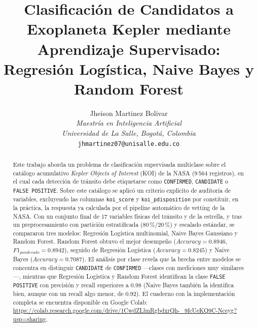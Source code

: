 \documentclass[10pt,journal]{IEEEtran}
\begin{document}
  \title{Clasificaci\'on de Candidatos a Exoplaneta Kepler mediante Aprendizaje Supervisado:\\
    Regresi\'on Log\'istica, Naive Bayes y Random Forest}

  \author{
    Jheison Martinez Bolivar\\
    \textit{Maestr\'ia en Inteligencia Artificial}\\
    \textit{Universidad de La Salle, Bogot\'a, Colombia}\\
    \texttt{jhmartinez07@unisalle.edu.co}
  }
  \maketitle

  \begin{abstract}
    Este trabajo aborda un problema de clasificaci\'on supervisada multiclase sobre el cat\'alogo acumulativo \emph{Kepler Objects of Interest} (KOI) de la NASA (9\,564 registros), en el cual cada detecci\'on de tr\'ansito debe etiquetarse como \texttt{CONFIRMED}, \texttt{CANDIDATE} o \texttt{FALSE POSITIVE}. Sobre este cat\'alogo se aplic\'o un criterio expl\'icito de auditor\'ia de variables, excluyendo las columnas \texttt{koi\_score} y \texttt{koi\_pdisposition} por constituir, en la pr\'actica, la respuesta ya calculada por el pipeline autom\'atico de vetting de la NASA. Con un conjunto final de 17 variables f\'isicas del tr\'ansito y de la estrella, y tras un preprocesamiento con partici\'on estratificada (80\,\%/20\,\%) y escalado est\'andar, se compararon tres modelos: Regresi\'on Log\'istica multinomial, Naive Bayes Gaussiano y Random Forest. Random Forest obtuvo el mejor desempe\~no ($Accuracy=0.8946$, $F1_{ponderado}=0.8942$), seguido de Regresi\'on Log\'istica ($Accuracy=0.8245$) y Naive Bayes ($Accuracy=0.7087$). El an\'alisis por clase revela que la brecha entre modelos se concentra en distinguir \texttt{CANDIDATE} de \texttt{CONFIRMED} —clases con mediciones muy similares—, mientras que Regresi\'on Log\'istica y Random Forest identifican la clase \texttt{FALSE POSITIVE} con precisi\'on y recall superiores a 0.98 (Naive Bayes tambi\'en la identifica bien, aunque con un recall algo menor, de 0.92). El cuaderno con la implementaci\'on completa se encuentra disponible en Google Colab: \url{https://colab.research.google.com/drive/1CwdZLlmRgbdxrQh-_9fcUeKQ9C-Nceyg?usp=sharing}.
  \end{abstract}
\end{document}
